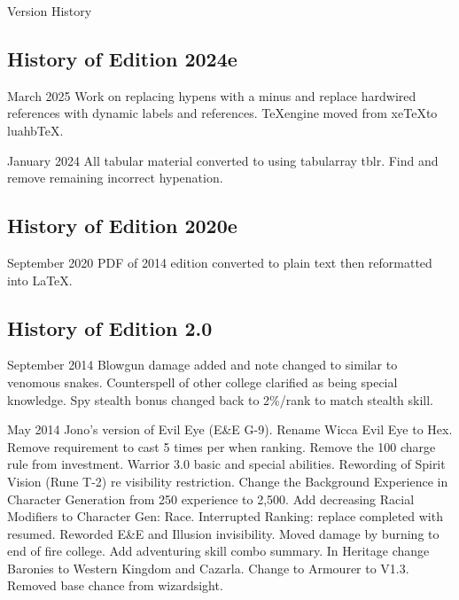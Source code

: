 \begin{Chapter}{Version History}

\subsection{History of Edition 2024e}

\begin{Description}

\item[March 2025] Work on replacing hypens with a minus and
  replace hardwired references with dynamic labels and
  references.  \TeX engine moved from xe\TeX to luahb\TeX.
    
\item[January 2024] All tabular material converted to using
  tabularray tblr.  Find and remove remaining incorrect hypenation.

\subsection{History of Edition 2020e}

\item[September 2020] PDF of 2014 edition converted to plain
text then reformatted into \LaTeX.

\end{Description}

\subsection{History of Edition 2.0}

\begin{Description}

\item[September 2014] Blowgun damage added and note changed to similar
  to venomous snakes.  Counterspell of other college clarified as
  being special knowledge.  Spy stealth bonus changed back to 2\%/rank
  to match stealth skill.

\item[May 2014] Jono's version of Evil Eye (E\&E G-9).  Rename Wicca
  Evil Eye to Hex.  Remove requirement to cast 5 times per when
  ranking.  Remove the 100 charge rule from investment.  Warrior 3.0
  basic and special abilities.  Rewording of Spirit Vision (Rune T-2)
  re visibility restriction.  Change the Background Experience in
  Character Generation from 250 experience to 2,500.  Add decreasing
  Racial Modifiers to Character Gen: Race.  Interrupted Ranking:
  replace completed with resumed.  Reworded E\&E and Illusion
  invisibility.  Moved damage by burning to end of fire college.  Add
  adventuring skill combo summary.  In Heritage change Baronies to
  Western Kingdom and Cazarla.  Change to Armourer to V1.3.  Removed
  base chance from wizardsight.


\end{Description}
\end{Chapter}
